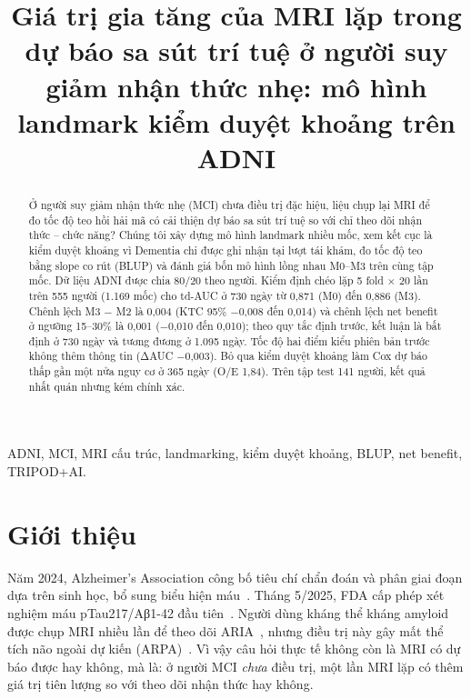 \documentclass[conference]{IEEEtran}
\begin{document}
\title{Giá trị gia tăng của MRI lặp trong dự báo sa sút trí tuệ ở người suy giảm nhận thức nhẹ: mô hình landmark kiểm duyệt khoảng trên ADNI}

\author{
}

\maketitle

\begin{abstract}
Ở người suy giảm nhận thức nhẹ (MCI) chưa điều trị đặc hiệu, liệu chụp lại MRI để đo tốc độ teo hồi hải mã có cải thiện dự báo sa sút trí tuệ so với chỉ theo dõi nhận thức – chức năng? Chúng tôi xây dựng mô hình landmark nhiều mốc, xem kết cục là kiểm duyệt khoảng vì Dementia chỉ được ghi nhận tại lượt tái khám, đo tốc độ teo bằng slope co rút (BLUP) và đánh giá bốn mô hình lồng nhau M0–M3 trên cùng tập mốc. Dữ liệu ADNI được chia 80/20 theo người. Kiểm định chéo lặp 5 fold × 20 lần trên 555 người (1.169 mốc) cho td-AUC ở 730 ngày từ 0,871 (M0) đến 0,886 (M3). Chênh lệch M3 − M2 là 0,004 (KTC 95\% −0,008 đến 0,014) và chênh lệch net benefit ở ngưỡng 15–30\% là 0,001 (−0,010 đến 0,010); theo quy tắc định trước, kết luận là bất định ở 730 ngày và tương đương ở 1.095 ngày. Tốc độ hai điểm kiểu phiên bản trước không thêm thông tin (ΔAUC −0,003). Bỏ qua kiểm duyệt khoảng làm Cox dự báo thấp gần một nửa nguy cơ ở 365 ngày (O/E 1,84). Trên tập test 141 người, kết quả nhất quán nhưng kém chính xác.
\end{abstract}

\begin{IEEEkeywords}
ADNI, MCI, MRI cấu trúc, landmarking, kiểm duyệt khoảng, BLUP, net benefit, TRIPOD+AI.
\end{IEEEkeywords}

\section{Giới thiệu}
Năm 2024, Alzheimer's Association công bố tiêu chí chẩn đoán và phân giai đoạn dựa trên sinh học, bổ sung biểu hiện máu~\cite{jack2024}. Tháng 5/2025, FDA cấp phép xét nghiệm máu pTau217/Aβ1-42 đầu tiên~\cite{fda2025}. Người dùng kháng thể kháng amyloid được chụp MRI nhiều lần để theo dõi ARIA~\cite{ema}, nhưng điều trị này gây mất thể tích não ngoài dự kiến (ARPA)~\cite{belder2024}. Vì vậy câu hỏi thực tế không còn là MRI có dự báo được hay không, mà là: ở người MCI \emph{chưa} điều trị, một lần MRI lặp có thêm giá trị tiên lượng so với theo dõi nhận thức hay không.
\end{document}
